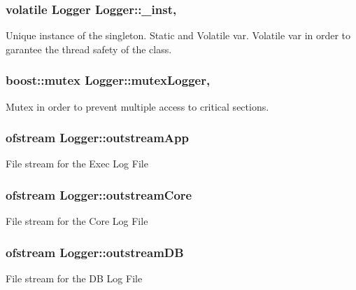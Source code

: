 \subsubsection[{\+\_\+inst}]{\setlength{\rightskip}{0pt plus 5cm}volatile {\bf Logger} Logger\+::\+\_\+inst\hspace{0.3cm}{\ttfamily [static]}, {\ttfamily [private]}}\label{class_logger_a39df000f4fac08812f2d0d86aac1d515}
Unique instance of the singleton. Static and Volatile var. Volatile var in order to garantee the thread safety of the class. \hypertarget{class_logger_a24ccccd925d3a0f19a7f1ad04f112fd9}{}
\subsubsection[{mutex\+Logger}]{\setlength{\rightskip}{0pt plus 5cm}boost\+::mutex Logger\+::mutex\+Logger\hspace{0.3cm}{\ttfamily [static]}, {\ttfamily [private]}}\label{class_logger_a24ccccd925d3a0f19a7f1ad04f112fd9}
Mutex in order to prevent multiple access to critical sections. \hypertarget{class_logger_aa072491e9f6b7208344fb26b79225c26}{}
\subsubsection[{outstream\+App}]{\setlength{\rightskip}{0pt plus 5cm}ofstream Logger\+::outstream\+App\hspace{0.3cm}{\ttfamily [private]}}\label{class_logger_aa072491e9f6b7208344fb26b79225c26}
File stream for the Exec Log File \hypertarget{class_logger_a2a107070a319d033978c6af26dd733fd}{}
\subsubsection[{outstream\+Core}]{\setlength{\rightskip}{0pt plus 5cm}ofstream Logger\+::outstream\+Core\hspace{0.3cm}{\ttfamily [private]}}\label{class_logger_a2a107070a319d033978c6af26dd733fd}
File stream for the Core Log File \hypertarget{class_logger_a17c9760c7e2905943827e9bd39184234}{}
\subsubsection[{outstream\+D\+B}]{\setlength{\rightskip}{0pt plus 5cm}ofstream Logger\+::outstream\+D\+B\hspace{0.3cm}{\ttfamily [private]}}\label{class_logger_a17c9760c7e2905943827e9bd39184234}
File stream for the D\+B Log File \hypertarget{class_logger_a0f77a112075ae81cfc89f79225967486}{}
